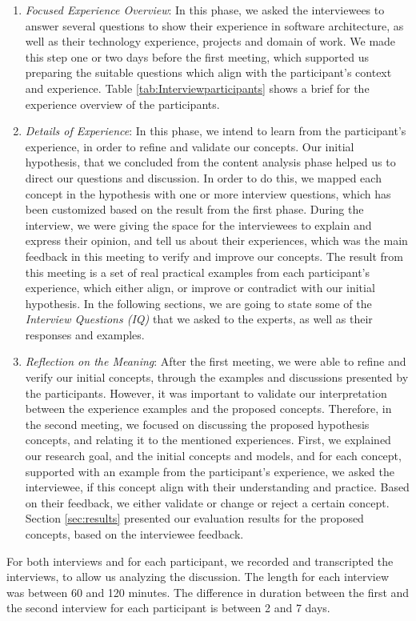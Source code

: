 \documentclass[conference]{IEEEtran}
\begin{document}
\begin{enumerate}
\item \textit{Focused Experience Overview}: In this phase, we asked the
interviewees to answer several questions to show their experience in software
architecture, as well as their technology experience, projects and domain of
work. We made this step one or two days before the first meeting, which
supported us preparing the suitable questions which align with the participant's
context and experience. Table \ref{tab:Interviewparticipants} shows a brief
for the experience overview of the participants.
\item \textit{Details of Experience}: In this phase, we intend to learn from the
participant's experience, in order to refine and validate our concepts. Our
initial hypothesis, that we concluded from the content analysis phase helped us
to direct our questions and discussion. In order to do this, we mapped each
concept in the hypothesis with one or more interview questions, which has been
customized based on the result from the first phase. During the interview, we
were giving the space for the interviewees to explain and express their opinion,
and tell us about their experiences, which was the main feedback in this meeting
to verify and improve our concepts. The result from this meeting is a set of
real practical examples from each participant's experience, which either align,
or improve or contradict with our initial hypothesis. In the following sections,
we are going to state some of the \textit{Interview Questions (IQ)} that we asked to the
experts, as well as their responses and examples.
\item \textit{Reflection on the Meaning}: After the first meeting, we were able
to refine and verify our initial concepts, through the examples and discussions
presented by the participants. However, it was important to validate our
interpretation between the experience examples and the proposed
concepts. Therefore, in the second meeting, we focused on discussing the
proposed hypothesis concepts, and relating it to the mentioned experiences.
First, we explained our research goal, and the initial concepts and models, and
for each concept, supported with an example from the participant's experience, we asked
the interviewee, if this concept align with their understanding and practice.
Based on their feedback, we either validate or change or reject a certain
concept. Section \ref{sec:results} presented our evaluation results for the
proposed concepts, based on the interviewee feedback.
\end{enumerate}
For both interviews and for each participant, we recorded and transcripted the
interviews, to allow us analyzing the discussion. The length for each interview
was between 60 and 120 minutes. The difference in duration between the first and
the second interview for each participant is between 2 and 7 days.
\end{document}

